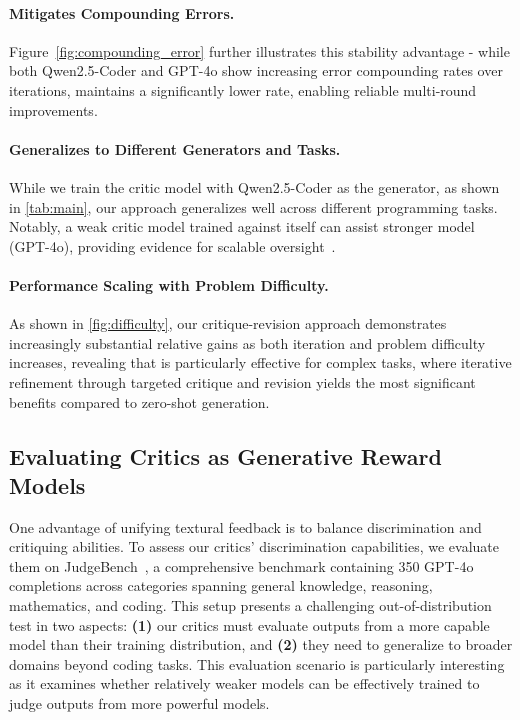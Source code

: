 \paragraph{{\ours} Mitigates Compounding Errors.}
Figure~\ref{fig:compounding_error} further illustrates this stability advantage - while both Qwen2.5-Coder and GPT-4o show increasing error compounding rates over iterations, {\ours} maintains a significantly lower rate, enabling reliable multi-round improvements.

\paragraph{{\ours} Generalizes to Different Generators and Tasks.}
While we train the critic model with Qwen2.5-Coder as the generator, as shown in \cref{tab:main}, our approach generalizes well across different programming tasks.
Notably, a weak critic model trained against itself can assist stronger model (GPT-4o), providing evidence for scalable oversight~\cite{christiano2018supervising,kenton2024scalable}.






\paragraph{Performance Scaling with Problem Difficulty.}
As shown in \cref{fig:difficulty}, our critique-revision approach demonstrates increasingly substantial relative gains as both iteration and  problem difficulty increases, revealing that {\ours} is particularly effective for complex tasks, where iterative refinement through targeted critique and revision yields the most significant benefits compared to zero-shot generation.

\subsection{Evaluating Critics as Generative Reward Models}\label{sec:judgebench_exp}

One advantage of unifying textural feedback is to balance discrimination and critiquing abilities.
To assess our critics' discrimination capabilities, we evaluate them on JudgeBench~\cite{tan2024judgebench}, a comprehensive benchmark containing 350 GPT-4o completions across categories spanning general knowledge, reasoning, mathematics, and coding.
This setup presents a challenging out-of-distribution test in two aspects: \textbf{(1)} our critics must evaluate outputs from a more capable model than their training distribution, and \textbf{(2)} they need to generalize to broader domains beyond coding tasks.
This evaluation scenario is particularly interesting as it examines whether relatively weaker models can be effectively trained to judge outputs from more powerful models.

